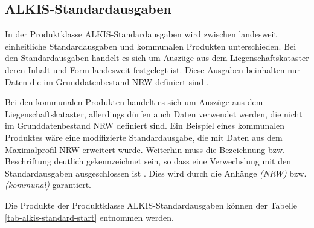 \subsection{ALKIS-Standardausgaben}

In der Produktklasse ALKIS-Standardausgaben wird zwischen landesweit einheitliche Standardausgaben und kommunalen Produkten unterschieden.
Bei den Standardausgaben handelt es sich um Auszüge aus dem Liegenschaftskataster deren Inhalt und Form landesweit festgelegt ist.
Diese Ausgaben beinhalten nur Daten die im Grunddatenbestand NRW definiert sind \autocite[vgl.][8]{bezk-grunddaten}.

Bei den kommunalen Produkten handelt es sich um Auszüge aus dem Liegenschaftskataster, allerdings dürfen auch Daten verwendet werden, die nicht im Grunddatenbestand NRW definiert sind. Ein Beispiel eines kommunalen Produktes wäre eine modifizierte Standardausgabe, die mit Daten aus dem Maximalprofil NRW erweitert wurde. Weiterhin muss die Bezeichnung bzw. Beschriftung deutlich gekennzeichnet sein, so dass eine Verwechslung mit den Standardausgaben ausgeschlossen ist \autocite[vgl.][9]{bezk-grunddaten}. Dies wird durch die Anhänge \textit{(NRW)} bzw. \textit{(kommunal)} garantiert.

Die Produkte der Produktklasse ALKIS-Standardausgaben können der Tabelle \ref{tab-alkis-standard-start}  entnommen werden.

